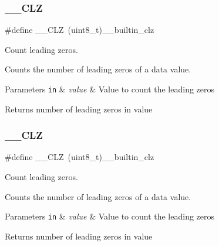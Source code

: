 \subsubsection{\texorpdfstring{\+\_\+\+\_\+\+C\+LZ}{\_\_CLZ}\hspace{0.1cm}{\footnotesize\ttfamily [2/3]}}
{\footnotesize\ttfamily \#define \+\_\+\+\_\+\+C\+LZ~(uint8\+\_\+t)\+\_\+\+\_\+builtin\+\_\+clz}



Count leading zeros. 

Counts the number of leading zeros of a data value. 
\begin{DoxyParams}[1]{Parameters}
\mbox{\tt in}  & {\em value} & Value to count the leading zeros \\
\hline
\end{DoxyParams}
\begin{DoxyReturn}{Returns}
number of leading zeros in value 
\end{DoxyReturn}
\mbox{\label{group___c_m_s_i_s___core___instruction_interface_ga5d5bb1527e042be4a9fa5a33f65cc248}} 
\subsubsection{\texorpdfstring{\+\_\+\+\_\+\+C\+LZ}{\_\_CLZ}\hspace{0.1cm}{\footnotesize\ttfamily [3/3]}}
{\footnotesize\ttfamily \#define \+\_\+\+\_\+\+C\+LZ~(uint8\+\_\+t)\+\_\+\+\_\+builtin\+\_\+clz}



Count leading zeros. 

Counts the number of leading zeros of a data value. 
\begin{DoxyParams}[1]{Parameters}
\mbox{\tt in}  & {\em value} & Value to count the leading zeros \\
\hline
\end{DoxyParams}
\begin{DoxyReturn}{Returns}
number of leading zeros in value 
\end{DoxyReturn}
\mbox{\label{group___c_m_s_i_s___core___instruction_interface_ga671101179b5943990785f36f8c1e2269}} 
